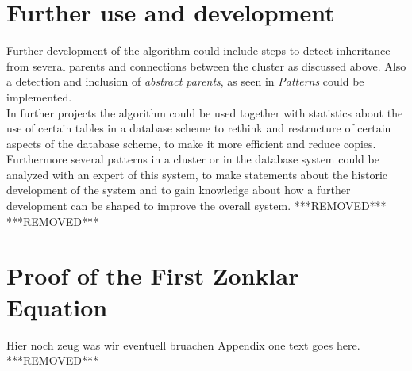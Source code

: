 \documentclass[10pt, journal, twocolumn]{IEEEtran}
\begin{document}
\section{Further use and development}
Further development of the algorithm could include steps to detect inheritance from several parents and connections between the cluster as discussed above. Also a detection and inclusion of \textit{abstract parents}, as seen in \textit{Patterns} could be implemented. \\ In further projects the algorithm could be used together with statistics about the use of certain tables in a database scheme to rethink and restructure of certain aspects of the database scheme, to make it more efficient and reduce copies. Furthermore several patterns in a cluster or in the database system could be analyzed with an expert of this system, to make statements about the historic development of the system and to gain knowledge about how a further development can be shaped to improve the overall system.
***REMOVED***
%
***REMOVED***
\appendices
\section{Proof of the First Zonklar Equation}
Hier noch zeug was wir eventuell bruachen
Appendix one text goes here.
***REMOVED***
\end{document}
